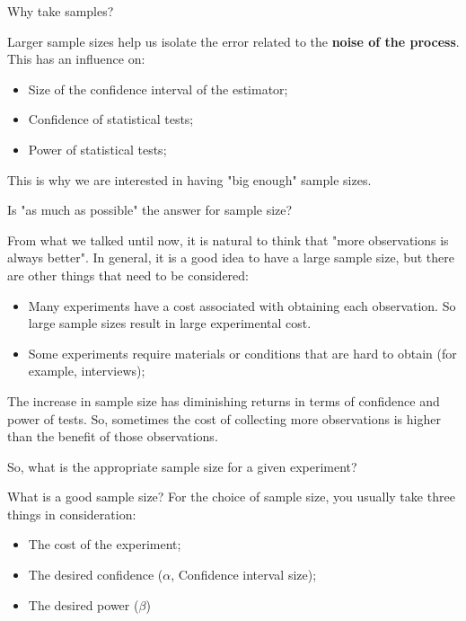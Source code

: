 \begin{frame}{Why take samples?}{}

Larger sample sizes help us isolate the error related to the {\bf noise of the
process}. This has an influence on:\bigskip

\begin{itemize}
  \item Size of the confidence interval of the estimator;
  \item Confidence of statistical tests;
  \item Power of statistical tests;
\end{itemize}\bigskip

This is why we are interested in having "big enough" sample sizes.
\end{frame}

\begin{frame}{Is "as much as possible" the answer for sample size?}

  From what we talked until now, it is natural to think that "more observations is always better". In general, it is a good idea to have a large sample size, but
  there are other things that need to be considered:\bigskip


  \begin{itemize}
    \item Many experiments have a cost associated with obtaining each observation. So large sample sizes result in large experimental cost.\medskip

    \item Some experiments require materials or conditions that are hard to obtain
    (for example, interviews);
  \end{itemize}\bigskip

  The increase in sample size has \alert{diminishing returns} in terms of confidence and power of tests. So, sometimes the cost of collecting more observations is higher than the benefit of those observations.
  \medskip

  So, what is the appropriate sample size for a given experiment?
\end{frame}

\begin{frame}{What is a good sample size?}
  For the choice of sample size, you usually take three things in consideration:
  \bigskip

  \begin{itemize}
    \item The cost of the experiment;
    \item The desired confidence ($\alpha$, Confidence interval size);
    \item The desired power ($\beta$)
  \end{itemize}\bigskip
\end{frame}

